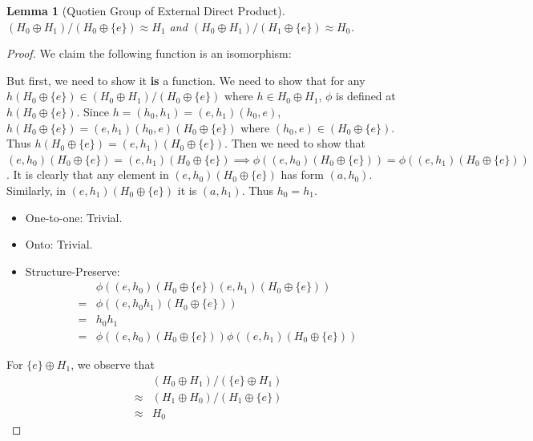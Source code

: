 \documentclass[14pt]{extarticle}
\newtheorem{lemma}{Lemma}[section]
\begin{document}
\begin{lemma}[Quotien Group of External Direct Product]
  $(H_0 \oplus H_1) / (H_0 \oplus \{ e \}) \approx H_1$ and $(H_0 \oplus H_1) / (H_1 \oplus \{ e \}) \approx H_0$.
\end{lemma}
\begin{proof}
  {
    \newcommand{\coset}{(H_0 \oplus \{ e \})}

    We claim the following function is an isomorphism:

    \begin{center}
      \boxed{\phi((e , h)\coset) = h}
    \end{center}

    But first, we need to show it \textbf{is} a function.
    We need to show that for any $h\coset \in (H_0 \oplus H_1)/\coset$ where $h \in H_0 \oplus H_1$,
    $\phi$ is defined at $h\coset$. Since $h = (h_0 , h_1) = (e , h_1) (h_0 , e)$,
    $h\coset = (e , h_1) (h_0 , e) \coset$ where $(h_0 , e) \in \coset$.
    Thus $h\coset = (e , h_1) \coset$. Then we need to show that
    $(e , h_0)\coset = (e , h_1)\coset \implies \phi((e , h_0)\coset) = \phi((e, h_1)\coset)$.
    It is clearly that any element in $(e , h_0)\coset$ has form $(a , h_0)$.
    Similarly, in $(e , h_1)\coset$ it is $(a , h_1)$. Thus $h_0 = h_1$.

    \begin{itemize}
      \item One-to-one: Trivial.
      \item Onto: Trivial.
      \item Structure-Preserve:
        \begin{align*}
           & \phi((e , h_0)\coset (e , h_1)\coset) \\
          =& \phi((e , h_0 h_1)\coset) \\
          =& h_0 h_1 \\
          =& \phi((e , h_0)\coset) \phi((e , h_1)\coset)
        \end{align*}
    \end{itemize}
  }

  For $\{ e \} \oplus H_1$, we observe that 
  \begin{align*}
     & (H_0 \oplus H_1) / (\{ e \} \oplus H_1) \\
    \approx & (H_1 \oplus H_0) / (H_1 \oplus \{ e \}) \\
    \approx & H_0
  \end{align*}
\end{proof}
\end{document}
